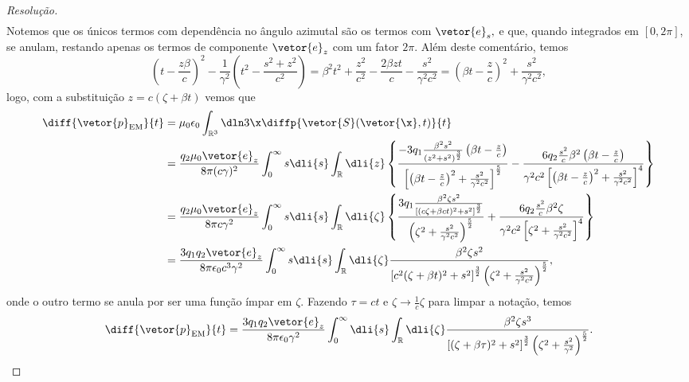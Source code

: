 \begin{proof}[Resolução]
\begin{align*}
   \end{align*}
   Notemos que os únicos termos com dependência no ângulo azimutal são os termos com \(\vetor{e}_s,\) e que, quando integrados em \([0,2\pi]\), se anulam, restando apenas os termos de componente \(\vetor{e}_z\) com um fator \(2\pi\). Além deste comentário, temos
   \begin{equation*}
      \left(t - \frac{z \beta}{c}\right)^2 - \frac{1}{\gamma^2} \left(t^2 - \frac{s^2 + z^2}{c^2}\right) = \beta^2 t^2 + \frac{z^2}{c^2} - \frac{2 \beta z t}{c} - \frac{s^2}{\gamma^2 c^2} = \left(\beta t - \frac{z}{c}\right)^2 + \frac{s^2}{\gamma^2 c^2},
   \end{equation*}
   logo, com a substituição \(z = c( \zeta + \beta t)\) vemos que
   \begin{align*}
      \diff{\vetor{p}_\mathrm{EM}}{t} 
      &= \mu_0 \epsilon_0 \int_{\mathbb{R}^3} \dln3\x \diffp{\vetor{S}(\vetor{\x}, t)}{t}\\
      &= \frac{q_2 \mu_0 \vetor{e}_z}{8\pi (c \gamma)^2} \int_{0}^{\infty} s \dli{s} \int_{\mathbb{R}} \dli{z} \left\{
      \frac{-3q_1 \frac{\beta^2 s^2}{(z^2 + s^2)^{\frac32}} \left(\beta t - \frac{z}{c}\right)}{\left[\left(\beta t - \frac{z}{c}\right)^2+ \frac{s^2}{\gamma^2c^2}\right]^{\frac52}}
         -\frac{6q_2 \frac{s^2}{c} \beta^2\left(\beta t - \frac{z}{c}\right)}{\gamma^2 c^2\left[\left(\beta t - \frac{z}{c}\right)^2+ \frac{s^2}{\gamma^2c^2}\right]^{4}} \right\}\\
      &= \frac{q_2 \mu_0 \vetor{e}_z}{8\pi c\gamma^2} \int_{0}^{\infty} s \dli{s} \int_{\mathbb{R}} \dli{\zeta} \left\{
      \frac{3q_1 \frac{\beta^2 \zeta s^2}{[(c\zeta + \beta c t)^2 + s^2]^{\frac32}}}{\left(\zeta^2+ \frac{s^2}{\gamma^2c^2}\right)^{\frac52}}
         +\frac{6q_2 \frac{s^2}{c} \beta^2 \zeta }{\gamma^2 c^2\left[\zeta^2+ \frac{s^2}{\gamma^2c^2}\right]^{4}} \right\}\\
      &= \frac{3 q_1 q_2 \vetor{e}_z}{8\pi \epsilon_0 c^3\gamma^2} \int_{0}^{\infty} s \dli{s} \int_{\mathbb{R}} \dli{\zeta} \frac{\beta^2 \zeta s^2}{\left[c^2(\zeta + \beta t)^2 + s^2\right]^{\frac32} \left(\zeta^2 + \frac{s^2}{\gamma^2 c^2}\right)^{\frac52}},
   \end{align*}
   onde o outro termo se anula por ser uma função ímpar em \(\zeta.\) Fazendo \(\tau = c t\) e \(\zeta \to \frac1c \zeta\) para limpar a notação, temos
   \begin{equation*}
      \diff{\vetor{p}_{\mathrm{EM}}}{t} = \frac{3 q_1 q_2 \vetor{e}_z}{8\pi \epsilon_0 \gamma^2} \int_{0}^{\infty} \dli{s} \int_{\mathbb{R}} \dli{\zeta} \frac{\beta^2 \zeta s^3}{\left[(\zeta + \beta \tau)^2 + s^2\right]^{\frac32} \left(\zeta^2 + \frac{s^2}{\gamma^2}\right)^{\frac52}}.

\end{equation*}
\end{proof}
